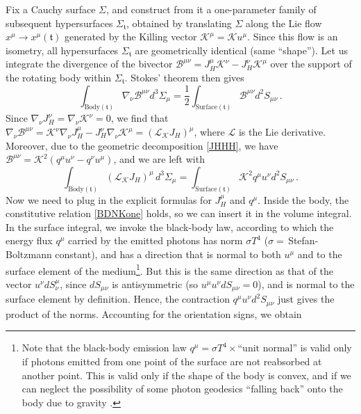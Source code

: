 \documentclass[a4paper, amsfonts, amssymb, amsmath, reprint, showkeys, nofootinbib, twoside, onecolumn,notitlepage]{revtex4-1}
\newcommand{\K}{{\mathcal{K}}}
\theoremstyle{definition}
\theoremstyle{theorem}
\begin{document}
Fix a Cauchy surface $\Sigma$, and construct from it a one-parameter family of subsequent hypersurfaces $\Sigma_\mathfrak{t}$, obtained by translating $\Sigma$ along the Lie flow $x^\mu \rightarrow  x^\mu(\mathfrak{t})$  generated by the Killing vector $\K^\mu{=}\K u^\mu$. Since this flow is an isometry, all hypersurfaces $\Sigma_\mathfrak{t}$ are geometrically identical (same ``shape''). Let us integrate the divergence of the bivector $\mathcal{B}^{\mu \nu}=J_H^\mu \K^\nu -J_H^\nu \K^\mu$ over the support of the rotating body within $\Sigma_{\mathfrak{t}}$. Stokes' theorem \cite[\S 3.3.3]{PoissonToolkit2009pwt} then gives
\begin{equation}
\int_{\text{Body}(\mathfrak{t})} \nabla_\nu \mathcal{B}^{\mu \nu} d^3 \Sigma_\mu =\dfrac{1}{2} \int_{\text{Surface}(\mathfrak{t})} \mathcal{B}^{\mu \nu} d^2 S_{\mu \nu} \, .
\end{equation}
Since $\nabla_\nu J_H^\nu =\nabla_\nu \K^\nu=0$, we find that $\nabla_\nu \mathcal{B}^{\mu \nu}=\K^\nu \nabla_\nu J_H^\mu -J_H^\nu \nabla_\nu \K^\mu=(\mathcal{L}_\K J_H)^\mu$, where $\mathcal{L}$ is the Lie derivative. Moreover, due to the geometric decomposition \eqref{JHHH}, we have $\mathcal{B}^{\mu \nu}=\K^2 (q^\mu u^\nu {-}q^\nu u^\mu)$, and we are left with
\begin{equation}
\int_{\text{Body}(\mathfrak{t})} (\mathcal{L}_\K J_H)^\mu \, d^3 \Sigma_\mu = \int_{\text{Surface}(\mathfrak{t})} \K^2 q^{\mu} u^{\nu}  d^2 S_{\mu \nu} \, .
\end{equation}
Now we need to plug in the explicit formulas for $J_H^\mu$ and $q^\mu$. Inside the body, the constitutive relation \eqref{BDNKone} holds, so we can insert it in the volume integral. In the surface integral, we invoke the black-body law, according to which the energy flux $q^\mu$ carried by the emitted photons has norm $\sigma T^4$ ($\sigma =\, $Stefan-Boltzmann constant), and has a direction that is normal to both $u^\mu$ and to the surface element of the medium\footnote{\label{foOwuiotz}Note that the black-body emission law $q^\mu =\sigma T^4 \times \text{``unit normal''}$ is valid only if photons emitted from one point of the surface are not reabsorbed at another point. This is valid only if the shape of the body is convex, and if we can neglect the possibility of some photon geodesics ``falling back'' onto the body due to gravity \cite{Baines:2023bgm}.}. But this is the same direction as that of the vector $u^\nu dS_{\nu}^\mu$, since $dS_{\mu \nu}$ is antisymmetric (so $u^\mu u^\nu dS_{\mu \nu}{=}0$), and is normal to the surface element by definition. Hence, the contraction $q^{\mu} u^{\nu}  d^2 S_{\mu \nu}$ just gives the product of the norms. Accounting for the orientation signs, we obtain 
\end{document}
